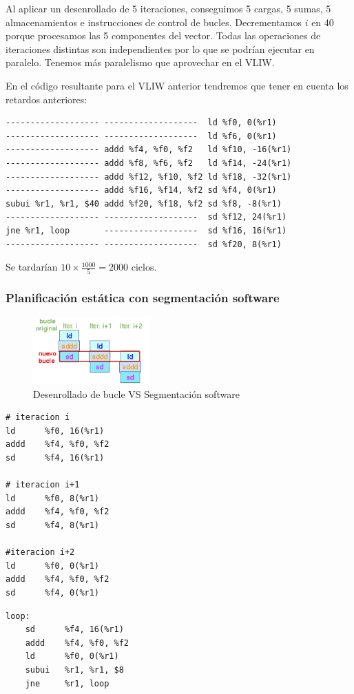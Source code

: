 \documentclass[10pt,a4paper,spanish]{report}
\begin{document}
Al aplicar un desenrollado de 5 iteraciones, conseguimos 5 cargas, 5 sumas, 5 almacenamientos e instrucciones de control de bucles. Decrementamos $i$ en 40 porque procesamos las 5 componentes del vector. Todas las operaciones de iteraciones distintas son independientes por lo que se podrían ejecutar en paralelo. Tenemos más paralelismo que aprovechar en el VLIW. 

En el código resultante para el VLIW anterior tendremos que tener en cuenta los retardos anteriores:

\begin{verbatim}
------------------- -------------------  ld %f0, 0(%r1)
------------------- -------------------  ld %f6, 0(%r1)
------------------- addd %f4, %f0, %f2   ld %f10, -16(%r1)
------------------- addd %f8, %f6, %f2   ld %f14, -24(%r1)
------------------- addd %f12, %f10, %f2 ld %f18, -32(%r1)
------------------- addd %f16, %f14, %f2 sd %f4, 0(%r1)
subui %r1, %r1, $40 addd %f20, %f18, %f2 sd %f8, -8(%r1)
------------------- -------------------  sd %f12, 24(%r1)
jne %r1, loop       -------------------  sd %f16, 16(%r1)
------------------- -------------------  sd %f20, 8(%r1)
\end{verbatim}

Se tardarían $10 \times \frac{1000}{5} = 2000$ ciclos.

\textcolor{azul}{\subsubsection{Planificación estática con segmentación software}}

\begin{figure}[!h]
\centering
\includegraphics[width=0.4\textwidth]{111}
\caption{Desenrollado de bucle VS Segmentación software}
\label{esquema_sp}
\end{figure}

\begin{minipage}{0.5\textwidth}
\begin{verbatim}
# iteracion i
ld      %f0, 16(%r1)
addd    %f4, %f0, %f2
sd      %f4, 16(%r1)

# iteracion i+1
ld      %f0, 8(%r1)
addd    %f4, %f0, %f2
sd      %f4, 8(%r1)

#iteracion i+2
ld      %f0, 0(%r1)
addd    %f4, %f0, %f2
sd      %f4, 0(%r1)
\end{verbatim}
\end{minipage}
\begin{minipage}{0.5\textwidth}
\begin{verbatim}
loop:
    sd      %f4, 16(%r1)
    addd    %f4, %f0, %f2
    ld      %f0, 0(%r1)
    subui   %r1, %r1, $8
    jne     %r1, loop
\end{verbatim}
\end{minipage}
\end{document}
